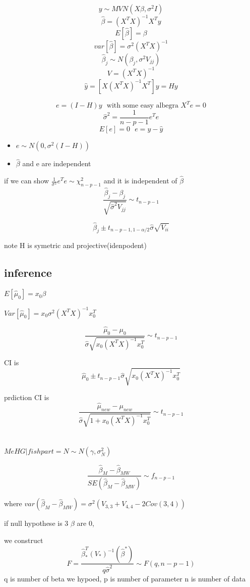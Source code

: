 \documentclass[10pt]{article}
\theoremstyle{break}
\begin{document}
     $$y\sim MVN(X\beta,\sigma^2I)$$
     $$\hat\beta=(X^TX)^{-1}X^Ty$$
     $$E[\hat\beta]=\beta$$
     $$var[\hat\beta]=\sigma^2(X^TX)^{-1}$$
     $$\hat\beta_j\sim N(\beta_j,\sigma^2V_{jj})$$
     $$V=(X^TX)^{-1}$$
     $$\hat y=[X(X^TX)^{-1}X^T]y=Hy$$

     $$e=(I-H)y~~~\text{with some easy albegra }X^Te=0$$
     $$\hat\sigma^2=\frac{1}{n-p-1}e^Te$$
     $$E[e]=0~~~e=y-\hat y$$
     \begin{itemize}
         \item $e\sim N(0,\sigma^2(I-H))$
         \item $\hat \beta$ and e are independent
     \end{itemize}
     if we can show $\frac{1}{\sigma^2}e^Te\sim\chi^2_{n-p-1}$ and it is independent of $\hat\beta$
     $$\frac{\hat\beta_j-\beta_j}{\sqrt{\hat\sigma^2V_{jj}}}\sim t_{n-p-1}$$

     $$\hat\beta_j\pm t_{n-p-1,1-\alpha/2}\hat\sigma\sqrt{V_{ii}}$$

     note H is symetric and projective(idenpodent)

     \subsection{inference}
     $E[\hat\mu_0]=x_0\beta$

     $Var[\hat\mu_0]=x_0\sigma^2(X^TX)^{-1}x_0^T$

     $$\frac{\hat\mu_0-\mu_0}{\hat\sigma\sqrt{x_0(X^TX)^{-1}x_0^T}}\sim t_{n-p-1}$$

     CI is $$\hat\mu_0\pm t_{n-p-1}\hat\sigma\sqrt{x_0(X^TX)^{-1}x_0^T}$$

     prdiction CI is 
     $$\frac{\hat\mu_{new}-\mu_{new}}{\hat\sigma\sqrt{1+x_0(X^TX)^{-1}x_0^T}}\sim t_{n-p-1}$$


     \section{}
     $MeHG|fishpart=N \sim N(\gamma, \sigma_N^2)$

     $$\frac{\hat\beta_M-\hat\beta_{MW}}{SE(\hat\beta_M-\hat\beta_{MW})}\sim f_{n-p-1}$$

     where $var(\hat\beta_M-\hat\beta_{MW})=\sigma^2(V_{3,3}+V_{4,4}-2Cov(3,4))$


     if null hypothese is 3 $\beta$ are 0,

     we construct 
     $$F=\frac{\hat\beta_*^T(V_*)^{-1}(\hat\beta^*)}{q\hat\sigma^2}\sim F(q,n-p-1)$$
     q is number of beta we hypoed, p is number of parameter n is number of data
\end{document}
